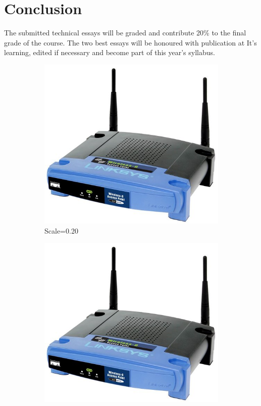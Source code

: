 \documentclass[a4paper,11pt]{article}
\begin{document}
\section{Conclusion}
The submitted technical essays will be graded and contribute 20\% to the final grade of the course. The two best essays will be honoured with publication at It's learning, edited if necessary and become part of this year's  syllabus.

\begin{figure}[hbp]
	\centering
	\begin{subfigure}[b]{0.3\textwidth}
		\centering
		\includegraphics[scale=0.20]{linksys}
		\caption{Scale=0.20}
	\end{subfigure}
	\begin{subfigure}[b]{0.3\textwidth}
		\centering		
		\includegraphics[scale=0.15]{linksys}

\end{subfigure}
\end{figure}
\end{document}
